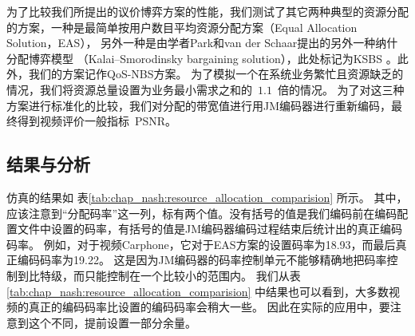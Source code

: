 为了比较我们所提出的议价博弈方案的性能，我们测试了其它两种典型的资源分配的方案，一种是最简单按用户数目平均资源分配方案（Equal Allocation Solution，EAS），
另外一种是由学者Park和van der Schaar提出的另外一种纳什分配博弈模型 （Kalai–Smorodinsky  bargaining  solution），此处标记为KSBS \cite{ParkVanderSchaar2007}。此外，我们的方案记作QoS-NBS方案。
为了模拟一个在系统业务繁忙且资源缺乏的情况，我们将资源总量设置为业务最小需求之和的~$1.1$~倍的情况。
为了对这三种方案进行标准化的比较，我们对分配的带宽值进行用JM编码器进行重新编码，最终得到视频评价一般指标~PSNR。

\subsection{结果与分析}
仿真的结果如 表\ref{tab:chap_nash:resource_allocation_comparision} 所示。
其中，应该注意到“分配码率”这一列，标有两个值。没有括号的值是我们编码前在编码配置文件中设置的码率，有括号的值是JM编码器编码过程结束后统计出的真正编码码率。
例如，对于视频Carphone，它对于EAS方案的设置码率为18.93，而最后真正编码码率为19.22。
这是因为JM编码器的码率控制单元不能够精确地把码率控制到比特级，而只能控制在一个比较小的范围内。
我们从表\ref{tab:chap_nash:resource_allocation_comparision} 中结果也可以看到，大多数视频的真正的编码码率比设置的编码码率会稍大一些。
因此在实际的应用中，要注意到这个不同，提前设置一部分余量。
